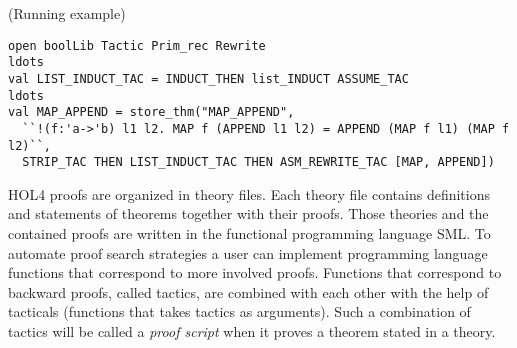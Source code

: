 \documentclass[runningheads,a4paper,draft]{svjour3}
\def\holfour{\textsf{HOL4}\xspace}
\def\sml{\textsf{SML}\xspace}
\def\polyml{\textsf{Poly/ML}\xspace}
\begin{document}
\begin{example}\label{ex:running}(Running example)
\small
\begin{lstlisting}[language=SMLSmall,frame=tb]
open boolLib Tactic Prim_rec Rewrite
ldots
val LIST_INDUCT_TAC = INDUCT_THEN list_INDUCT ASSUME_TAC
ldots
val MAP_APPEND = store_thm("MAP_APPEND",
  ``!(f:'a->'b) l1 l2. MAP f (APPEND l1 l2) = APPEND (MAP f l1) (MAP f l2)``,
  STRIP_TAC THEN LIST_INDUCT_TAC THEN ASM_REWRITE_TAC [MAP, APPEND])
\end{lstlisting}
\end{example} 

%
%
%

\holfour proofs are organized in theory files.
Each theory file contains definitions and statements of theorems together with
their proofs. Those theories and the contained proofs
are written
in the functional programming language \sml. To automate
proof search strategies a user can implement programming language functions
that correspond to more involved proofs.
Functions that correspond to backward proofs, called tactics, are combined with 
each other with the help of 
tacticals (functions that takes
tactics as arguments). Such a combination of tactics will be called a 
\emph{proof script} when it
proves a theorem stated in a theory.
\end{document}
